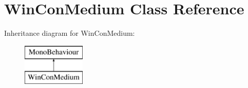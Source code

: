\hypertarget{class_win_con_medium}{}\section{Win\+Con\+Medium Class Reference}
\label{class_win_con_medium}
Inheritance diagram for Win\+Con\+Medium\+:\begin{figure}[H]
\begin{center}
\leavevmode
\includegraphics[height=2.000000cm]{class_win_con_medium}
\end{center}
\end{figure}
